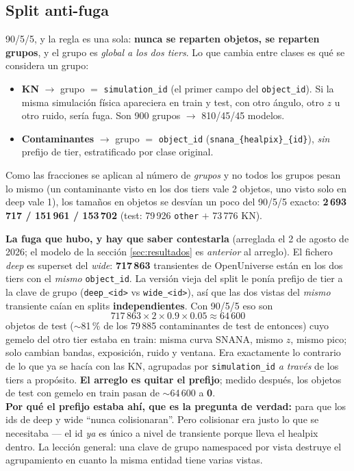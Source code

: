 \documentclass[11pt,a4paper]{article}
\newcommand{\code}[1]{\texttt{\small #1}}
\newlength{\examenpad}
\newenvironment{examen}
  {\par\medskip\noindent
   \begin{lrbox}{\examenbox}%
   \begin{minipage}{\dimexpr\linewidth-2\examenpad}\small}
  {\end{minipage}%
   \end{lrbox}%
   {\setlength{\fboxsep}{\examenpad}\colorbox{boxgray}{\usebox{\examenbox}}}%
   \par\medskip}
\begin{document}
\subsection{Split anti-fuga}
\label{sec:split}
90/5/5, y la regla es una sola: \textbf{nunca se reparten objetos, se reparten grupos}, y el grupo
es \emph{global a los dos tiers}. Lo que cambia entre clases es qué se considera un grupo:
\begin{itemize}[nosep]
  \item \textbf{KN} $\to$ grupo $=$ \code{simulation\_id} (el primer campo del \code{object\_id}).
        Si la misma simulación física apareciera en train y test, con otro ángulo, otro $z$ u otro
        ruido, sería fuga. Son 900 grupos $\to$ 810/45/45 modelos.
  \item \textbf{Contaminantes} $\to$ grupo $=$ \code{object\_id}
        (\code{snana\_\{healpix\}\_\{id\}}), \emph{sin} prefijo de tier, estratificado por clase
        original.
\end{itemize}
Como las fracciones se aplican al número de \emph{grupos} y no todos los grupos pesan lo mismo
(un contaminante visto en los dos tiers vale 2 objetos, uno visto solo en deep vale 1), los tamaños
en objetos se desvían un poco del 90/5/5 exacto: \textbf{2\,693\,717 / 151\,961 / 153\,702}
(test: 79\,926 \code{other} $+$ 73\,776 KN).

\begin{examen}
\textbf{La fuga que hubo, y hay que saber contestarla} (arreglada el 2 de agosto de 2026; el modelo
de la sección \ref{sec:resultados} es \emph{anterior} al arreglo). El fichero \emph{deep} es
superset del \emph{wide}: \textbf{717\,863} transientes de OpenUniverse están en los dos tiers con
el \emph{mismo} \code{object\_id}. La versión vieja del split le ponía prefijo de tier a la clave de
grupo (\code{deep\_<id>} vs \code{wide\_<id>}), así que las dos vistas del \emph{mismo} transiente
caían en splits \textbf{independientes}. Con 90/5/5 eso son
\[
717\,863 \times 2 \times 0.9 \times 0.05 \approx 64\,600
\]
objetos de test ($\sim$81\,\% de los 79\,885 contaminantes de test de entonces) cuyo gemelo del otro
tier estaba en train: misma curva SNANA, mismo $z$, mismo pico; solo cambian bandas, exposición,
ruido y ventana. Era exactamente lo contrario de lo que ya se hacía con las KN, agrupadas por
\code{simulation\_id} \emph{a través} de los tiers a propósito. \textbf{El arreglo es quitar el
prefijo}; medido después, los objetos de test con gemelo en train pasan de $\sim$64\,600 a
\textbf{0}.\\[2pt]
\textbf{Por qué el prefijo estaba ahí, que es la pregunta de verdad:} para que los ids de deep y
wide ``nunca colisionaran''. Pero colisionar era justo lo que se necesitaba --- el id \emph{ya} es
único a nivel de transiente porque lleva el healpix dentro. La lección general: una clave de grupo
namespaced por vista destruye el agrupamiento en cuanto la misma entidad tiene varias vistas.
\end{examen}
\end{document}
